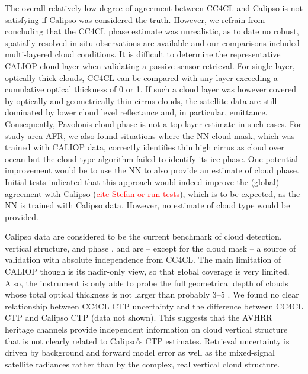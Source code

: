 The overall relatively low degree of agreement between CC4CL and Calipso is not satisfying if Calipso was considered the truth. However, we refrain from concluding that the CC4CL phase estimate was unrealistic, as to date no robust, spatially resolved in-situ observations are available and our comparisons included multi-layered cloud conditions. It is difficult to determine the representative CALIOP cloud layer when validating a passive sensor retrieval. For single layer, optically thick clouds, CC4CL can be compared with any layer exceeding a cumulative optical thickness of 0 or 1. If such a cloud layer was however covered by optically and geometrically thin cirrus clouds, the satellite data are still dominated by lower cloud level reflectance and, in particular, emittance. Consequently, Pavolonis cloud phase is not a top layer estimate in such cases. For study area AFR, we also found situations where the NN cloud mask, which was trained with CALIOP data, correctly identifies thin high cirrus as cloud over ocean but the cloud type algorithm failed to identify its ice phase. One potential improvement would be to use the NN to also provide an estimate of cloud phase. Initial tests indicated that this approach would indeed improve the (global) agreement with Calipso (\textcolor{red}{cite Stefan or run tests}), which is to be expected, as the NN is trained with Calipso data. However, no estimate of cloud type would be provided.

Calipso data are considered to be the current benchmark of cloud detection, vertical structure, and phase \citep{Winker09,Karlsson13,Holz08}, and are -- except for the cloud mask -- a source of validation with absolute independence from CC4CL. The main limitation of CALIOP though is its nadir-only view, so that global coverage is very limited. Also, the instrument is only able to probe the full geometrical depth of clouds whose total optical thickness is not larger than probably 3--5 \citep{Karlsson13}. We found no clear relationship between CC4CL CTP uncertainty and the difference between CC4CL CTP and Calipso CTP (data not shown). This suggests that the AVHRR heritage channels provide independent information on cloud vertical structure that is not clearly related to Calipso's CTP estimates. Retrieval uncertainty is driven by background and forward model error as well as the mixed-signal satellite radiances rather than by the complex, real vertical cloud structure.
